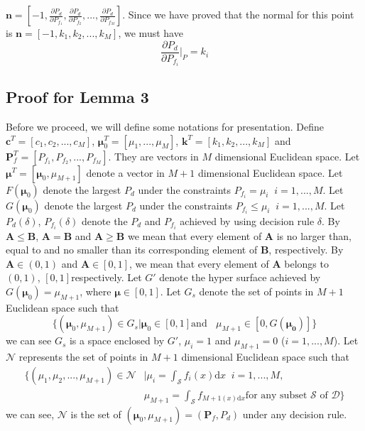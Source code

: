 \documentclass[12pt,journal,a4paper,twoside,onecolumn]{IEEEtran}
\begin{document}
\begin{spacing}{2.5}
 $\mathbf{n} = [-1, \frac{\partial P_d}{\partial P_{f_1}}, \frac{\partial P_d}{\partial P_{f_2}}, ..., \frac{\partial P_d}{\partial P_{f_M}}]$. Since we have proved that  the normal for this point is $\mathbf{n} = [-1, k_1, k_2, ..., k_M]$, we must have
\begin{equation}
\frac{\partial P_d}{\partial P_{f_i}}\bigg|_{P} = k_i
\end{equation}


\subsection{Proof for Lemma 3}
\newcommand{\bmu}{\boldsymbol{\mu}}
Before we proceed, we will define some notations for presentation.
Define $\mathbf{c}^T = [c_1, c_2, ..., c_M]$, $\boldsymbol{\mu}_0^T = [\mu_1, ..., \mu_M]$, $\mathbf{k}^T = [k_1, k_2, ..., k_M]$ and  $\mathbf{P}_f^T = [P_{f_1}, P_{f_2}, ..., P_{f_M}]$. They are vectors in $M$ dimensional Euclidean  space. Let $\bmu^T = [\bmu_0, \mu_{M+1}]$ denote a vector in $M+1$ dimensional Euclidean space. Let $F(\boldsymbol{\mu}_0)$ denote the largest $P_d$ under the constraints $P_{f_i} = \mu_i\;\;i = 1, ..., M$.
Let $G(\boldsymbol{\mu}_0)$ denote the largest $P_d$ under the constraints $P_{f_i} \leq \mu_i\;\;i = 1, ..., M$.
Let $P_d(\delta)$, $P_{f_i}(\delta)$ denote the $P_d$ and $P_{f_i}$ achieved by using decision rule $\delta$.
By $\mathbf{A} \leq \mathbf{B}$, $\mathbf{A} = \mathbf{B}$ and  $\mathbf{A} \geq \mathbf{B}$ we mean that every element of $\mathbf{A}$ is no larger than, equal to and no smaller than its corresponding element of $\mathbf{B}$, respectively. 
By $\mathbf{A} \in (0, 1)$ and $\mathbf{A} \in [0, 1]$, we mean that every element of $\mathbf{A}$ belongs to $(0, 1)$, $[0, 1]$respectively.  
Let $G'$ denote the hyper surface achieved by $G(\bmu_0) = \mu_{M+1}$, where $\bmu \in [0, 1]$.
Let $G_s$ denote the set of points in $M+1$ Euclidean space such that 
\[
 \{(\boldsymbol{\mu}_0, \mu_{M+1})\in G_s | \boldsymbol{\mu}_0\in [0, 1] \text{and }\;\;\mu_{M+1} \in [0, G(\mathbf{\bmu_0})]
    \}
\]
we can see $G_s$ is a space enclosed by $G'$, $\mu_i = 1$ and $\mu_{M+1}=0$ ($i=1, ..., M$).
Let $\mathcal{N}$ represents the set of points in $M+1$ dimensional Euclidean space such that  
\begin{equation}
\begin{split}
\{(\mu_1, \mu_2, ..., \mu_{M+1})\in \mathcal{N} &| \mu_i = \int_{\mathcal{S}}f_i(x)\mathrm{d}x \;\;i=1, ..., M,\\
                                            &  \mu_{M+1}=\int_{\mathcal{S}}f_{M+1(x)\mathrm{d}x} \text{for any subset $\mathcal{S}$ of $\mathcal{D}$}\}
\end{split}
\end{equation}
we can see, $\mathcal{N}$ is the set of $(\bmu_0, \mu_{M+1})=(\mathbf{P}_f, P_d)$ under any decision rule. 


\end{spacing}
\end{document}
